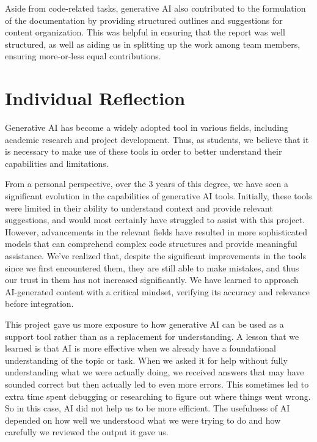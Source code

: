 \documentclass{article}
\begin{document}
Aside from code-related tasks, generative AI also contributed to the formulation of the documentation by providing structured outlines and suggestions for content organization. This was helpful in ensuring that the report was well structured, as well as aiding us in splitting up the work among team members, ensuring more-or-less equal contributions.

\section{Individual Reflection}

Generative AI has become a widely adopted tool in various fields, including academic research and project development. Thus, as students, we believe that it is necessary to make use of these tools in order to better understand their capabilities and limitations.

From a personal perspective, over the 3 years of this degree, we have seen a significant evolution in the capabilities of generative AI tools. Initially, these tools were limited in their ability to understand context and provide relevant suggestions, and would most certainly have struggled to assist with this project. However, advancements in the relevant fields have resulted in more sophisticated models that can comprehend complex code structures and provide meaningful assistance. We've realized that, despite the significant improvements in the tools since we first encountered them, they are still able to make mistakes, and thus our trust in them has not increased significantly. We have learned to approach AI-generated content with a critical mindset, verifying its accuracy and relevance before integration.

This project gave us more exposure to how generative AI can be used as a support tool rather than as a replacement for understanding. A lesson that we learned is that AI is more effective when we already have a foundational understanding of the topic or task. When we asked it for help without fully understanding what we were actually doing, we received answers that may have sounded correct but then actually led to even more errors. This sometimes led to extra time spent debugging or researching to figure out where things went wrong. So in this case, AI did not help us to be more efficient. The usefulness of AI depended on how well we understood what we were trying to do and how carefully we reviewed the output it gave us.
\end{document}
